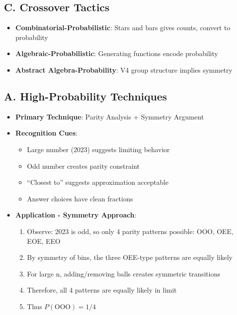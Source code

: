 \documentclass[12pt]{article}
\begin{document}
\begin{tacticalbox}
\subsection*{C. Crossover Tactics}
\begin{itemize}[leftmargin=*]
    \item \textbf{Combinatorial-Probabilistic}: Stars and bars gives counts, convert to probability
    \item \textbf{Algebraic-Probabilistic}: Generating functions encode probability
    \item \textbf{Abstract Algebra-Probability}: V4 group structure implies symmetry
\end{itemize}
\end{tacticalbox}

\begin{techniquesbox}
\subsection*{A. High-Probability Techniques}
\begin{itemize}[leftmargin=*]
    \item \textbf{Primary Technique}: Parity Analysis + Symmetry Argument
    \item \textbf{Recognition Cues}: 
    \begin{itemize}
        \item Large number (2023) suggests limiting behavior
        \item Odd number creates parity constraint
        \item ``Closest to'' suggests approximation acceptable
        \item Answer choices have clean fractions
    \end{itemize}
    \item \textbf{Application - Symmetry Approach}: 
    \begin{enumerate}
        \item Observe: 2023 is odd, so only 4 parity patterns possible: OOO, OEE, EOE, EEO
        \item By symmetry of bins, the three OEE-type patterns are equally likely
        \item For large n, adding/removing balls creates symmetric transitions
        \item Therefore, all 4 patterns are equally likely in limit
        \item Thus $P(\text{OOO}) = 1/4$
    \end{enumerate}
\end{itemize}


\end{techniquesbox}
\end{document}
